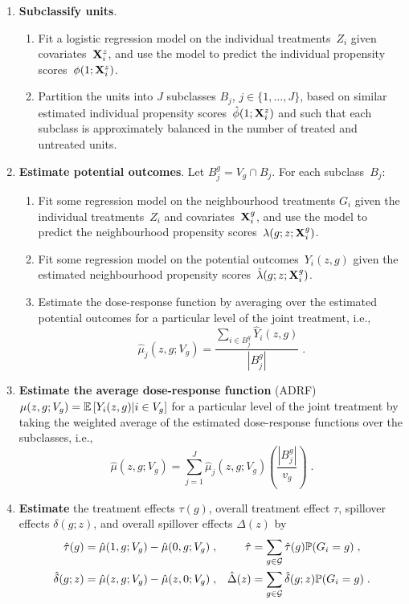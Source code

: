 \documentclass[10pt]{article}
\begin{document}
\begin{enumerate}

\item
\textbf{Subclassify units}.
\begin{enumerate}
\item
Fit a logistic regression model on the individual treatments~$Z_i$ given covariates~$\mathbf{X}_i^z$, and use the model to predict the individual propensity scores~$\phi(1;\mathbf{X}_i^z)$.
\item
Partition the units into $J$ subclasses $B_j$, $j\in\{1,\ldots,J\}$, based on similar estimated individual propensity scores~$\hat{\phi}(1;\mathbf{X}_i^z)$ and such that each subclass is approximately balanced in the number of treated and untreated units.
\end{enumerate}

\item
\textbf{Estimate potential outcomes}. Let $B_j^g=	V_g\cap B_j$. For each subclass~$B_j$:
\begin{enumerate}
\item
Fit some regression model on the neighbourhood treatments $G_i$ given the individual treatments~$Z_i$ and covariates~$\mathbf{X}_i^g$, and use the model to predict the neighbourhood propensity scores~$\lambda(g;z;\mathbf{X}_i^g)$.
\item
Fit some regression model on the potential outcomes~$Y_i(z,g)$ given the estimated neighbourhood propensity scores~$\hat{\lambda}(g;z;\mathbf{X}_i^g)$.
\item
Estimate the dose-response function by averaging over the estimated potential outcomes for a particular level of the joint treatment, i.e.,
\[
\hat{\mu}_j(z,g;V_g) = \frac{\sum_{i\in B_j^g}\hat{Y}_i(z,g)}{\left|B_j^g\right|}\;.
\]
\end{enumerate}

\item
\textbf{Estimate the average dose-response function} (ADRF) $\mu(z,g;V_g)=\mathbb{E}\left[Y_i(z,g)|i\in V_g\right]$ for a particular level of the joint treatment by taking the weighted average of the estimated dose-response functions over the subclasses, i.e.,
\[
\hat{\mu}(z,g;V_g) = \sum_{j=1}^J\hat{\mu}_j(z,g;V_g)\left(\frac{\left|B_j^g\right|}{v_g}\right) \;.
\]

\item
\textbf{Estimate} the treatment effects $\tau(g)$, overall treatment effect $\tau$, spillover effects $\delta(g;z)$, and overall spillover effects $\Delta(z)$ by
\begin{align*}
\hat{\tau}(g) &= \hat{\mu}(1,g;V_g) - \hat{\mu}(0,g;V_g) \;, & \hat{\tau}&=\sum_{g\in\mathcal{G}}\hat{\tau}(g)\mathbb{P}(G_i=g) \;, \\
\hat{\delta}(g;z) &= \hat{\mu}(z,g;V_g) - \hat{\mu}(z,0;V_g) \;, & \hat{\Delta}(z) &= \sum_{g\in\mathcal{G}}\hat{\delta}(g;z)\mathbb{P}(G_i=g)\;.
\end{align*}

\end{enumerate}
\end{document}
